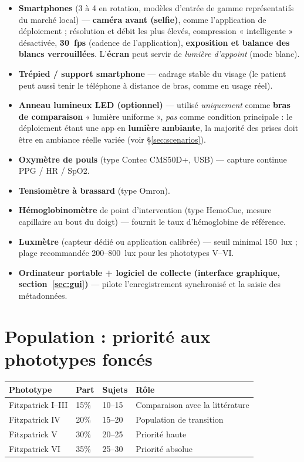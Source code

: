 \documentclass[11pt,a4paper]{article}
\begin{document}
\begin{itemize}
\item \textbf{Smartphones} (3 à 4 en rotation, modèles d'entrée de gamme
représentatifs du marché local) --- \textbf{caméra avant (selfie)}, comme
l'application de déploiement ; résolution et débit les plus élevés, compression
« intelligente » désactivée, \textbf{30~fps} (cadence de l'application),
\textbf{exposition et balance des blancs verrouillées}. L'\textbf{écran} peut servir
de \emph{lumière d'appoint} (mode blanc).
\item \textbf{Trépied / support smartphone} --- cadrage stable du visage (le patient
peut aussi tenir le téléphone à distance de bras, comme en usage réel).
\item \textbf{Anneau lumineux LED (optionnel)} --- utilisé \emph{uniquement} comme
\textbf{bras de comparaison} « lumière uniforme », \emph{pas} comme condition
principale : le déploiement étant une app en \textbf{lumière ambiante}, la majorité
des prises doit être en ambiance réelle variée (voir §\ref{sec:scenarios}).
\item \textbf{Oxymètre de pouls} (type Contec CMS50D+, USB) --- capture continue
PPG / HR / SpO2.
\item \textbf{Tensiomètre à brassard} (type Omron).
\item \textbf{Hémoglobinomètre} de point d'intervention (type HemoCue, mesure
capillaire au bout du doigt) --- fournit le taux d'hémoglobine de référence.
\item \textbf{Luxmètre} (capteur dédié ou application calibrée) --- seuil minimal
150~lux ; plage recommandée 200--800~lux pour les phototypes V--VI.
\item \textbf{Ordinateur portable + logiciel de collecte (interface graphique,
section~\ref{sec:gui})} --- pilote l'enregistrement synchronisé et la saisie des
métadonnées.
\end{itemize}

\section{Population : priorité aux phototypes foncés}

\begin{center}
\begin{tabularx}{\textwidth}{P{3.5cm} P{2cm} P{2.2cm} X}
\toprule
\textbf{Phototype} & \textbf{Part} & \textbf{Sujets} & \textbf{Rôle} \\
\midrule
Fitzpatrick I--III & 15\% & 10--15 & Comparaison avec la littérature \\
Fitzpatrick IV & 20\% & 15--20 & Population de transition \\
Fitzpatrick V & 30\% & 20--25 & Priorité haute \\
Fitzpatrick VI & 35\% & 25--30 & Priorité absolue \\
\bottomrule
\end{tabularx}
\end{center}
\end{document}
